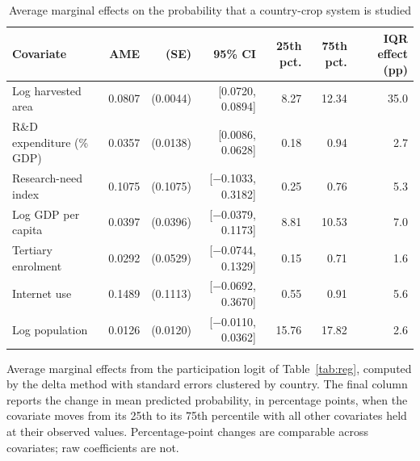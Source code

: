 \begin{table}[!t]
\centering
\footnotesize
\caption{Average marginal effects on the probability that a country-crop system is studied}
\label{tab:ame}
\begin{tabular*}{\textwidth}{@{\extracolsep\fill}l r r r r r r@{}}
\toprule
Covariate & AME & (SE) & 95\% CI & 25th pct. & 75th pct. & IQR effect (pp) \\
\midrule
Log harvested area & 0.0807 & (0.0044) & [0.0720, 0.0894] & 8.27 & 12.34 & 35.0 \\
R\&D expenditure (\% GDP) & 0.0357 & (0.0138) & [0.0086, 0.0628] & 0.18 & 0.94 & 2.7 \\
Research-need index & 0.1075 & (0.1075) & [$-$0.1033, 0.3182] & 0.25 & 0.76 & 5.3 \\
Log GDP per capita & 0.0397 & (0.0396) & [$-$0.0379, 0.1173] & 8.81 & 10.53 & 7.0 \\
Tertiary enrolment & 0.0292 & (0.0529) & [$-$0.0744, 0.1329] & 0.15 & 0.71 & 1.6 \\
Internet use & 0.1489 & (0.1113) & [$-$0.0692, 0.3670] & 0.55 & 0.91 & 5.6 \\
Log population & 0.0126 & (0.0120) & [$-$0.0110, 0.0362] & 15.76 & 17.82 & 2.6 \\
\bottomrule
\end{tabular*}
\begin{tablenotes}
\item[] Average marginal effects from the participation logit of Table~\ref{tab:reg}, computed by the delta method with standard errors clustered by country. The final column reports the change in mean predicted probability, in percentage points, when the covariate moves from its 25th to its 75th percentile with all other covariates held at their observed values. Percentage-point changes are comparable across covariates; raw coefficients are not.
\end{tablenotes}
\end{table}
